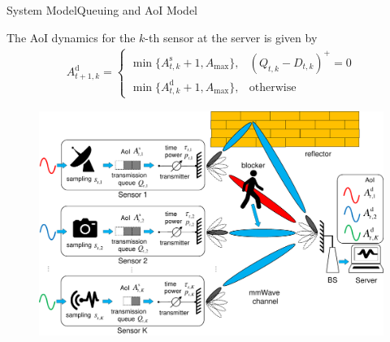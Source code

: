 \documentclass[aspectratio=169]{beamer}
\begin{document}
\begin{frame}{System Model}{Queuing and AoI Model}
\begin{minipage}[t]{0.55\linewidth}
        The AoI dynamics for the $k$-th sensor at the server is given by
        \begin{align*}
            A_{t+1,k}^{\mathrm{d}}
            \!=\!
            \begin{cases}
                \min\{A_{t,k}^{\mathrm{s}}\!+\!1,A_{\mathrm{max}}\}\!,
                &
                (Q_{t,k}\!-\!D_{t,k})^{+}\!=\!0 \\
                \min\{A_{t,k}^{\mathrm{d}}\!+\!1,A_{\mathrm{max}}\}\!,
                &
                \mathrm{otherwise}
            \end{cases}
        \end{align*}
    \end{minipage}
    \hspace{0.01\linewidth}
    \begin{minipage}[t]{0.40\linewidth}
        \begin{figure}
            \centering
            \includegraphics[width=\textwidth]{fig/network_model_v2.pdf}
        \end{figure}
    \end{minipage}
\end{frame}
\end{document}
